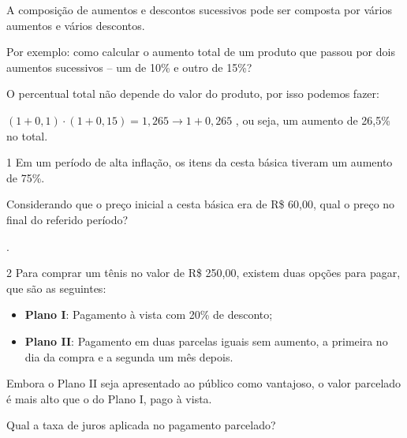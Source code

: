 {{{\begin{itemize}
\end{itemize}

A composição de aumentos e descontos sucessivos pode ser composta por
vários aumentos e vários descontos.

Por exemplo: como calcular o aumento total de um produto que 
passou por dois aumentos sucessivos -- um de 10\% e outro de 15\%?

O percentual total não depende do valor do produto, por isso podemos
fazer:

$(1 + 0,1) \cdot (1 + 0,15) = 1,265 \rightarrow 1 + 0,265$ , ou seja, um aumento 
de 26,5\% no total.
}


\num{1} Em um período de alta inflação, os itens da cesta básica tiveram
um aumento de 75\%.

Considerando que o preço inicial a cesta básica era de R\$ 60,00, qual
o preço no final do referido período?

.

\num{2} Para comprar um tênis no valor de R\$ 250,00, existem duas opções
para pagar, que são as seguintes:

\begin{itemize}
  \item \textbf{Plano I}: Pagamento à vista com 20\% de desconto;

  \item \textbf{Plano II}: Pagamento em duas parcelas iguais sem aumento, a primeira no dia da compra e a segunda um mês depois.
\end{itemize}

Embora o Plano II seja apresentado ao público como vantajoso, o valor
parcelado é mais alto que o do Plano I, pago à vista.

Qual a taxa de juros aplicada no pagamento parcelado?


}}
